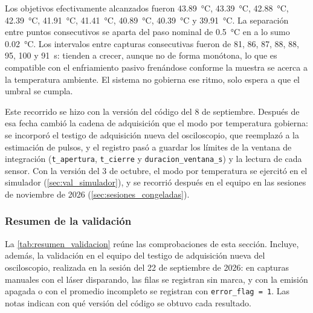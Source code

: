Los objetivos efectivamente alcanzados fueron \SI{43.89}{\celsius},
\SI{43.39}{\celsius}, \SI{42.88}{\celsius}, \SI{42.39}{\celsius},
\SI{41.91}{\celsius}, \SI{41.41}{\celsius}, \SI{40.89}{\celsius},
\SI{40.39}{\celsius} y \SI{39.91}{\celsius}. La separación entre
puntos consecutivos se aparta del paso nominal de
\SI{0.5}{\celsius} en a lo sumo \SI{0.02}{\celsius}. Los intervalos
entre capturas consecutivas fueron de 81, 86, 87, 88, 88, 95, 100 y
\SI{91}{\second}: tienden a crecer, aunque no de forma monótona, lo
que es compatible con el enfriamiento pasivo frenándose conforme la
muestra se acerca a la temperatura ambiente. El sistema no gobierna
ese ritmo, solo espera a que el umbral se cumpla.

Este recorrido se hizo con la versión del código del 8 de septiembre.
Después de esa fecha cambió la cadena de adquisición que el modo por
temperatura gobierna: se incorporó el testigo de adquisición nueva del
osciloscopio, que reemplazó a la estimación de pulsos, y el registro
pasó a guardar los límites de la ventana de integración
(\texttt{t\_apertura}, \texttt{t\_cierre} y
\texttt{duracion\_ventana\_s}) y la lectura de cada sensor. Con la
versión del 3 de octubre, el modo por temperatura se ejercitó en el
simulador (\cref{sec:val_simulador}), y se recorrió después en el
equipo en las sesiones de noviembre de 2026
(\cref{sec:sesiones_congeladas}).

\subsubsection*{Resumen de la validación}

La \cref{tab:resumen_validacion} reúne las comprobaciones de esta
sección. Incluye, además, la validación en el equipo del testigo de
adquisición nueva del osciloscopio, realizada en la sesión del 22 de
septiembre de 2026: en capturas manuales con el láser disparando, las
filas se registran sin marca, y con la emisión apagada o con el
promedio incompleto se registran con \texttt{error\_flag = 1}. Las
notas indican con qué versión del código se obtuvo cada resultado.

